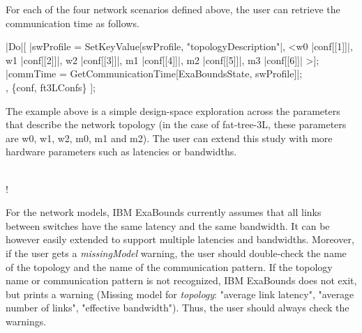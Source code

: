 For each of the four network scenarios defined above, the user can retrieve the communication time as follows. 
\begin{mma}	
	\In |Do|[\linebreak
		|swProfile = SetKeyValue[swProfile, "topologyDescription"|, \linebreak <\mid {}w0 \rightarrow |conf[[1]]|, w1 \rightarrow |conf[[2]]|, w2 \rightarrow |conf[[3]]|, \linebreak {}m1 \rightarrow |conf[[4]]|, m2 \rightarrow |conf[[5]]|, m3 \rightarrow |conf[[6]]| \mid>]; \\
	\In |commTime = GetCommunicationTime[ExaBoundsState, swProfile]|; \\
	\quad , \{conf, ft3LConfs\} ];
\end{mma}

The example above is a simple design-space exploration across the parameters that describe the network topology (in the case of fat-tree-3L, these parameters are w0, w1, w2, m0, m1 and m2). The user can extend this study with more hardware parameters such as latencies or bandwidths.

\vspace{0.5cm}
\begin{minipage}[t]{0.05\textwidth}
	~\\
	\Huge !
\end{minipage}
\begin{minipage}[t]{0.94\textwidth}
	For the network models, IBM ExaBounds currently assumes that all links between switches have the same latency and the same bandwidth. It can be however easily extended to support multiple latencies and bandwidths. Moreover, if the user gets a \textit{missingModel} warning, the user should double-check the name of the topology and the name of the communication pattern. If the topology name or communication pattern is not recognized, IBM ExaBounds does not exit, but prints a warning (Missing model for \textit{topology}: "average link latency", "average number of links", "effective bandwidth").	Thus, the user should always check the warnings.\\
\end{minipage}

